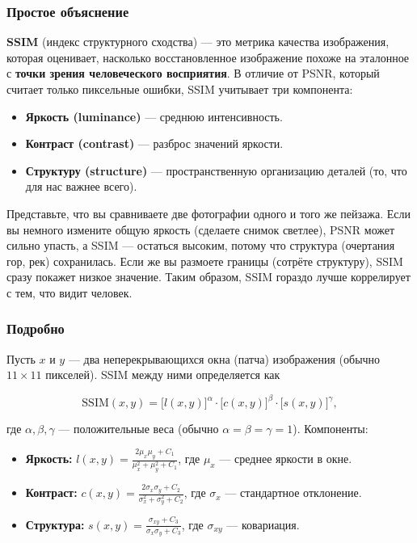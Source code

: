\documentclass[12pt,a4paper]{article}
\begin{document}
\subsubsection{Простое объяснение}

\textbf{SSIM} (индекс структурного сходства) — это метрика качества изображения, которая оценивает, насколько восстановленное изображение похоже на эталонное с \textbf{точки зрения человеческого восприятия}. В отличие от PSNR, который считает только пиксельные ошибки, SSIM учитывает три компонента:

\begin{itemize}
    \item \textbf{Яркость (luminance)} — среднюю интенсивность.
    \item \textbf{Контраст (contrast)} — разброс значений яркости.
    \item \textbf{Структуру (structure)} — пространственную организацию деталей (то, что для нас важнее всего).
\end{itemize}

Представьте, что вы сравниваете две фотографии одного и того же пейзажа. Если вы немного измените общую яркость (сделаете снимок светлее), PSNR может сильно упасть, а SSIM — остаться высоким, потому что структура (очертания гор, рек) сохранилась. Если же вы размоете границы (сотрёте структуру), SSIM сразу покажет низкое значение. Таким образом, SSIM гораздо лучше коррелирует с тем, что видит человек.

\subsubsection{Подробно}

Пусть \(x\) и \(y\) — два неперекрывающихся окна (патча) изображения (обычно \(11\times11\) пикселей). SSIM между ними определяется как

\[
\text{SSIM}(x,y) = \bigl[l(x,y)\bigr]^{\alpha} \cdot \bigl[c(x,y)\bigr]^{\beta} \cdot \bigl[s(x,y)\bigr]^{\gamma},
\]

где \(\alpha, \beta, \gamma\) — положительные веса (обычно \(\alpha=\beta=\gamma=1\)). Компоненты:

\begin{itemize}
    \item \textbf{Яркость:} \(l(x,y) = \frac{2\mu_x\mu_y + C_1}{\mu_x^2 + \mu_y^2 + C_1}\), где \(\mu_x\) — среднее яркости в окне.
    \item \textbf{Контраст:} \(c(x,y) = \frac{2\sigma_x\sigma_y + C_2}{\sigma_x^2 + \sigma_y^2 + C_2}\), где \(\sigma_x\) — стандартное отклонение.
    \item \textbf{Структура:} \(s(x,y) = \frac{\sigma_{xy} + C_3}{\sigma_x\sigma_y + C_3}\), где \(\sigma_{xy}\) — ковариация.
\end{itemize}
\end{document}
